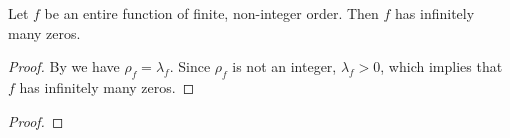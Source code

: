 \begin{theorem} \label{thm:finite-non-integer-order-infinite-zeros}
    Let $f$ be an entire function of finite, non-integer order. Then $f$ has infinitely many zeros.
\end{theorem}

\begin{proof}
    By  we have $\rho_f = \lambda_f$. Since $\rho_f$ is not an integer, $\lambda_f > 0$, which implies that $f$ has infinitely many zeros.
\end{proof}


\begin{theorem}[Borel] \label{thm:existence-borel-exceptional-values}
\end{theorem}

\begin{proof}
\end{proof}